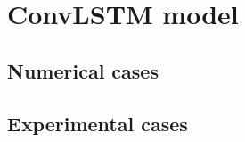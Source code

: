 \section{ConvLSTM model}
\label{sec53}


\lipsum[1]

\subsection{Numerical cases}
\label{sec531}

\lipsum[1]

\subsection{Experimental cases}
\label{sec532}

\lipsum[1]

